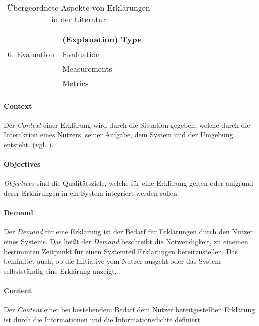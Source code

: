 \begin{table}
\begin{tabular}{|p{}|p{}|p{}|}
                        & (Explanation) Type    & \cite{ribera2019can} \cite{rosenfeld_explainability_2019} \\
        \hline
        6. Evaluation      & Evaluation            & \cite{kohl_explainability_2019} \cite{doshi2017towards} \\
                        & Measurements          & \cite{waa_evaluating_2021} \cite{balog_measuring_2020} \\
                        & Metrics               & \cite{nunes_systematic_2017} \cite{anjomshoae2019explainable}
                                                  \cite{chari_explanation_2020} \cite{waa_evaluating_2021}\\
        \hline
    \end{tabular}
\caption{Übergeordnete Aspekte von Erklärungen in der Literatur}
\label{tab:model_explaination_aspects}
\end{table}

\paragraph{Context} Der \textit{Context} einer Erklärung wird durch die Situation gegeben, welche durch die Interaktion eines Nutzers, seiner Aufgabe, dem System und der Umgebung entsteht. (vgl. \cite{chazette_knowledge_nodate, kohl_explainability_2019}).

\paragraph{Objectives} \textit{Objectives} sind die Qualitätsziele, welche für eine Erklärung gelten oder aufgrund derer Erklärungen in ein System integriert werden sollen.

\paragraph{Demand} Der \textit{Demand} für eine Erklärung ist der Bedarf für Erklärungen durch den Nutzer eines Systems. Das heißt der \textit{Demand} beschreibt die Notwendigkeit, zu einemen bestimmten Zeitpunkt für einen Systemteil Erklärungen bereitzustellen. Das beinhaltet auch, ob die Initiative vom Nutzer ausgeht oder das System selbstständig eine Erklärung anzeigt.

\paragraph{Content} Der \textit{Content} einer bei bestehendem Bedarf dem Nutzer bereitgestellten Erklärung ist durch die Informationen und die Informationsdichte definiert.

